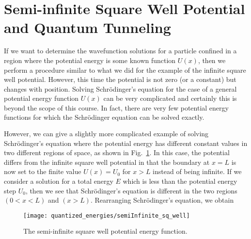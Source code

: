 

\section[Semi-infinite Square Well and Tunneling]{Semi-infinite Square Well Potential and Quantum Tunneling}

If we want to determine the wavefunction solutions for a particle confined
in a region where the potential energy is some known function $U(x)$,
then we perform a procedure similar to what we did for the example of the
infinite square well potential. However, this time the potential is not
zero (or a constant) but changes with position.  Solving Schr\"odinger's
equation for the case of a general potential energy function $U(x)$
can be very complicated and certainly this is beyond the scope of this
course. In fact, there are very few potential energy functions for which
the Schr\"odinger equation can be solved exactly.

However, we can give a slightly more complicated example of solving
Schr\"odinger's equation where the potential energy has different
constant values in two different regions of space, as shown in
Fig.~\ref{fig:semiInfiniteSquareWell}. In this case, the potential
differs from the infinite square well potential in that the boundary
at $x = L$ is now set to the finite value $U(x) = U_0$ for $x > L$
instead of being infinite. If we consider a solution for a total
energy $E$ which is less than the potential energy step $U_0$, then we
see that Schr\"{o}dinger's equation is different in the two regions $(0
< x < L)$ and $(x > L)$.  Rearranging Schr\"{o}dinger's equation, we
obtain

\begin{figure}[!t]
\begin{center}
\texttt{[image: quantized\_energies/semiInfinite\_sq\_well]}
\end{center}
\caption{The semi-infinite square well potential energy function.}
\label{fig:semiInfiniteSquareWell}
\end{figure}

